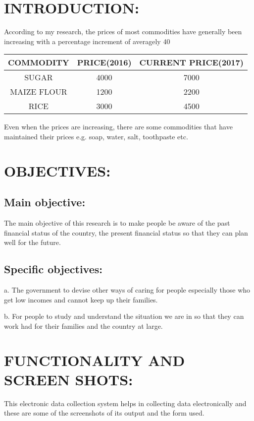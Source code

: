 \documentclass[14pt]{article}
\begin{document}
\section{INTRODUCTION:}
                       According to my research, the prices of most commodities have generally been increasing with a percentage increment of averagely 40%
\begin{table}[h]
\centering
\begin{tabular}{c c c}
\hline
COMMODITY &	PRICE(2016) &	CURRENT PRICE(2017)\\[0.5ex]
\hline
SUGAR &	4000	&7000\\
MAIZE FLOUR &	1200 &	2200\\
RICE &	3000 &	4500\\
\hline
\end{tabular}
\end{table}

Even when the prices are increasing, there are some commodities that have maintained their prices e.g. soap, water, salt, toothpaste etc.
\section{OBJECTIVES:}
\subsection{Main objective:}
    The main objective of this research is to make people be aware of the past financial status of the country, the present financial status so that they can plan well for the future.
\subsection{Specific objectives:}
a.	The government to devise other ways of caring for people especially those who get low incomes and cannot keep up their families.\par
b.	For people to study and understand the situation we are in so that they can work had for their families and the country at large.\par

\section{FUNCTIONALITY AND SCREEN SHOTS:}
This electronic data collection system helps in collecting data electronically and these are some of the screenshots of its output and the form used.
\end{document}

